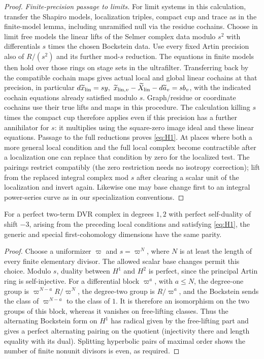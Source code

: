 \begin{proof}
\emph{Finite-precision passage to limits.}
For limit systems in this calculation, transfer the Shapiro models, localization triples, compact cup and trace as in the finite-model lemma, including unramified null via the residue cochains. Choose in limit free models the linear lifts of the Selmer complex data modulo \(s^2\) with differentials \(s\) times the chosen Bockstein data. Use every fixed Artin precision also of \(R/(s^2)\) and its further mod-\(s\) reduction. The equations in finite models then hold over those rings on stage sets in the ultrafilter. Transferring back by the compatible cochain maps gives actual local and global linear cochains at that precision, in particular \(d\widetilde x_{\rm lin}=s y,\ \widetilde x_{{\rm lin},v}-\widetilde X_{\rm lin}-d\widetilde a_v=s b_v\), with the indicated cochain equations already satisfied modulo \(s\). Graph/residue or coordinate cochains use their true lifts and maps in this procedure. The calculation killing \(s\) times the compact cup therefore applies even if this precision has a further annihilator for \(s\): it multiplies using the square-zero image ideal and these linear equations. Passage to the full reductions proves \eqref{eq:H1}. At places where both a more general local condition and the full local complex become contractible after a localization one can replace that condition by zero for the localized test. The pairings restrict compatibly (the zero restriction needs no isotropy correction); lift from the replaced integral complex mod \(s\) after clearing a scalar unit of the localization and invert again. Likewise one may base change first to an integral power-series curve as in our specialization conventions.

\end{proof}

\begin{corollary}\label{alternation-imaginary:parity}
For a perfect two-term DVR complex in degrees \(1,2\) with perfect self-duality of shift \(-3\), arising from the preceding local conditions and satisfying \eqref{eq:H1}, the generic and special first-cohomology dimensions have the same parity.
\end{corollary}
\begin{proof}
Choose a uniformizer \(\varpi\) and \(s=\varpi^N\), where \(N\) is at least the length of every finite elementary divisor. The allowed scalar base changes permit this choice. Modulo \(s\), duality between \(H^1\) and \(H^2\) is perfect, since the principal Artin ring is self-injective. For a differential block \(\varpi^a\), with \(a\le N\), the degree-one group is \(\varpi^{N-a}R/\varpi^N\), the degree-two group is \(R/\varpi^a\), and the Bockstein sends the class of \(\varpi^{N-a}\) to the class of \(1\). It is therefore an isomorphism on the two groups of this block, whereas it vanishes on free-lifting classes. Thus the alternating Bockstein form on \(H^1\) has radical given by the free-lifting part and gives a perfect alternating pairing on the quotient (injectivity there and length equality with its dual). Splitting hyperbolic pairs of maximal order shows the number of finite nonunit divisors is even, as required.
\end{proof}

